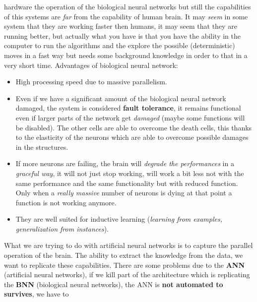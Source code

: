 \documentclass{article}
\begin{document}
hardware the operation of the biological neural networks but still the capabilities of this systems are \textit{far} from the
capability of human brain.
\newline\newline
It may \textit{seem} in some system that they are working faster then humans, it may seem that they are running better, but actually
what you have is that you have the ability in the computer to run the algorithms and the explore the
possible (deterministic) moves in a fast way but needs some background knowledge
in order to that in a very short time.
\newline\newline
Advantages of biological neural network:
\begin{itemize}
    \item High processing speed due to massive parallelism.

    \item Even if we have a significant amount of the biological neural network damaged, the system is
          considered \textbf{fault tolerance}, it remains functional even if larger parts of the network get \textit{damaged} (maybe some functions will be disabled).
          The other cells are able to overcome the death cells, this thanks to the elasticity of the neurons which are able
          to overcome possible damages in the structures.

    \item If more neurons are failing, the brain will \textit{degrade the performances} in a \textit{graceful way},
          it will not just stop working, will work a bit less not with the same performance and the same functionality
          but with reduced function. Only when a \textit{really massive} number of neurons is dying at that point a
          function is not working anymore.

    \item They are well suited for inductive learning (\textit{learning from examples, generalization from instances}).
\end{itemize}
What we are trying to do with artificial neural networks is to capture the parallel operation of the brain. The ability to
extract the knowledge from the data, we want to replicate these capabilities.
\newline\newline
There are some problems due to the \textbf{ANN} (artificial neural networks), if we kill part of the architecture which
is replicating the \textbf{BNN} (biological neural networks), the ANN is \textbf{not automated to survives}, we have to
\end{document}
